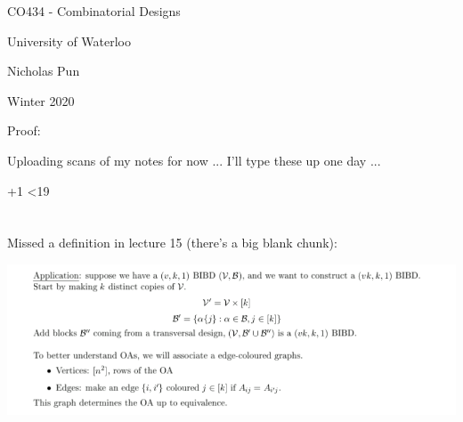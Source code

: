 \documentclass[12pt]{article}
\newcommand{\includelecture}[1]{
  
  
  \clearpage
}
\begin{document}
\begin{titlepage}
  \centering
  \vspace*{2in}
  {\huge CO434 - Combinatorial Designs}\par
  \vspace{0.5in}
  {\large University of Waterloo}\par
  {\large Nicholas Pun}\par
  {\large Winter 2020}\par 
\end{titlepage}

\tableofcontents
\clearpage

\clearpage

Proof:
\clearpage

Uploading scans of my notes for now ... I'll type these up one day ... 
\clearpage

\newcount\lecNum
{}
\loop
  \includelecture{\the\lecNum}
  \advance \lecNum +1
\ifnum \lecNum<19
\repeat

\section*{}
Missed a definition in lecture 15 (there's a big blank chunk):

\includegraphics[width=\textwidth]{sections/lec15.png}
\clearpage

\nocite{*}


\end{document}
